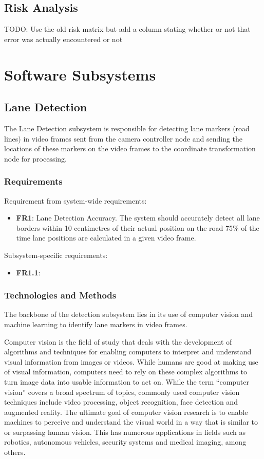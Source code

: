 \documentclass[titlepage]{article}
\begin{document}
\subsection{Risk Analysis}
TODO: Use the old risk matrix but add a column stating whether or not that error was actually encountered or not

\section{Software Subsystems}

\subsection{Lane Detection}

The Lane Detection subsystem is responsible for detecting lane markers (road lines) in video frames sent from the camera
controller node and sending the locations of these markers on the video frames to the coordinate transformation node for
processing.

\subsubsection{Requirements}

Requirement from system-wide requirements:

\begin{itemize}
	\item \textbf{FR1}: Lane Detection Accuracy. The system should accurately detect all lane borders within 10 centimetres
	      of their actual position on the road 75\% of the time lane positions are calculated in a given video frame.
\end{itemize}

Subsystem-specific requirements:
\begin{itemize}
	\item \textbf{FR1.1}:
\end{itemize}

\subsubsection{Technologies and Methods}

The backbone of the detection subsystem lies in its use of computer vision and machine learning to identify lane markers in video
frames.

Computer vision is the field of study that deals with the development of algorithms and techniques for enabling computers
to interpret and understand visual information from images or videos.
While humans are good at making use of visual information, computers need to rely on these complex algorithms to turn image
data into usable information to act on.
While the term ``computer vision'' covers a broad spectrum of topics, commonly used computer vision techniques include video
processing, object recognition, face detection and augmented reality.
The ultimate goal of computer vision research is to enable machines to perceive and understand the visual world in a way that
is similar to or surpassing human vision.
This has numerous applications in fields such as robotics, autonomous vehicles, security systems and medical imaging, among
others.
\end{document}
